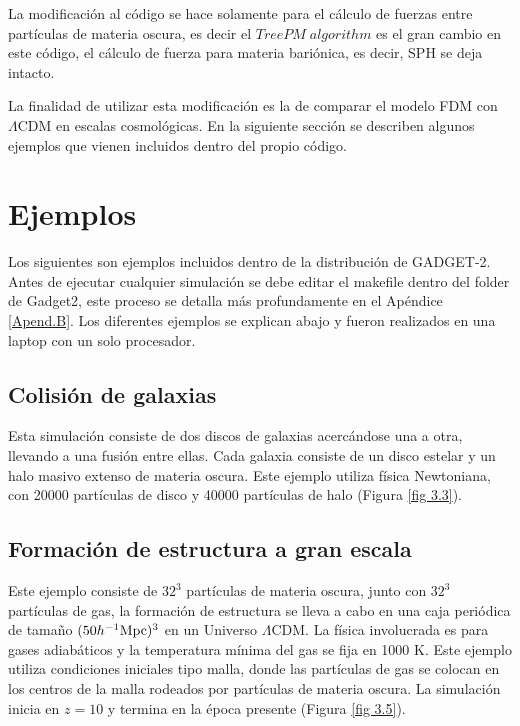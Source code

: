 \documentclass[a4paper,openright,12pt]{book}
\begin{document}
La modificación al código se hace solamente para el cálculo de fuerzas entre partículas de materia oscura, es decir el $TreePM\;algorithm$ es el gran cambio en este código, el cálculo de fuerza para materia bariónica, es decir, SPH se deja intacto.

La finalidad de utilizar esta modificación es la de comparar el modelo FDM con $\Lambda$CDM en escalas cosmológicas. En la siguiente sección se describen algunos ejemplos que vienen incluidos dentro del propio código.

\section{Ejemplos}
Los siguientes son ejemplos incluidos dentro de la distribución de GADGET-2. Antes de ejecutar cualquier simulación se debe editar el \textsf{makefile} dentro del folder de \textsf{Gadget2}, este proceso se detalla más profundamente en el Apéndice \ref{Apend.B}. Los diferentes ejemplos se explican abajo y fueron realizados en una laptop con un solo procesador.

\subsection{Colisión de galaxias}
Esta simulación consiste de dos discos de galaxias acercándose una a otra, llevando a una fusión entre ellas. Cada galaxia consiste de un disco estelar y un halo masivo extenso de materia oscura. Este ejemplo utiliza física Newtoniana, con 20000 partículas de disco y 40000 partículas de halo (Figura \ref{fig 3.3}). 

\subsection{Formación de estructura a gran escala}
Este ejemplo consiste de $32^{3}$ partículas de materia oscura, junto con $32^{3}$ partículas de gas, la formación de estructura se lleva a cabo en una caja periódica de tamaño $(50 h^{-1} \textup{Mpc})^{3}$ en un Universo $\Lambda$CDM. La física involucrada es para gases adiabáticos y la temperatura mínima del gas se fija en 1000 K. Este ejemplo utiliza condiciones iniciales tipo malla, donde las partículas de gas se colocan en los centros de la malla rodeados por partículas de materia oscura. La simulación inicia en $z = 10$ y termina en la época presente (Figura \ref{fig 3.5}).

\end{document}
